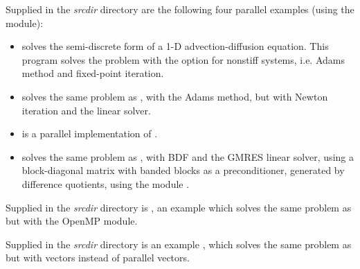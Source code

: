 \vspace{0.2in}\noindent Supplied in the
{\em srcdir} directory are the following
four parallel examples (using the {\nvecp} module):
\begin{itemize}
\item {} solves the semi-discrete form of a 1-D
  advection-diffusion equation.
  \newline
  This program solves the problem with the option for nonstiff
  systems, i.e. Adams method and fixed-point iteration.
\item {}
  solves the same problem as , with the Adams method,
  but with Newton iteration and the  linear solver.
\item {}
  is a parallel implementation of .
\item {}
  solves the same problem as , with BDF and the GMRES linear
  solver, using a block-diagonal matrix with banded blocks as a preconditioner,
  generated by difference quotients, using the module {\cvbbdpre}.
\end{itemize}

\vspace{0.2in}\noindent Supplied in the
{\em srcdir} directory is
, an example which solves the same problem as
 but with the OpenMP {\nvector} module.

\vspace{0.2in}\noindent Supplied in the
{\em srcdir} directory is an example
, which solves the same problem as
 but with {\hypre} vectors instead of
{\sundials} parallel vectors.


